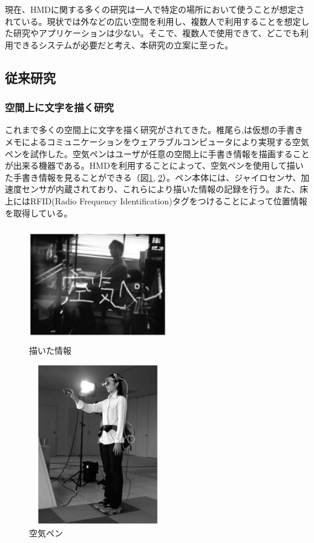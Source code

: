\documentclass[11pt,a4j, titlepage]{jarticle} %
\begin{document}
現在、HMDに関する多くの研究は一人で特定の場所において使うことが想定されている。現状では外などの広い空間を利用し、複数人で利用することを想定した研究やアプリケーションは少ない。そこで、複数人で使用できて、どこでも利用できるシステムが必要だと考え、本研究の立案に至った。

\subsection{従来研究}
\subsubsection{空間上に文字を描く研究}
これまで多くの空間上に文字を描く研究がされてきた。椎尾ら\cite{siio},\cite{siio2}は仮想の手書きメモによるコミュニケーションをウェアラブルコンピュータにより実現する空気ペンを試作した。空気ペンはユーザが任意の空間上に手書き情報を描画することが出来る機器である。HMDを利用することによって、空気ペンを使用して描いた手書き情報を見ることができる（図\ref{fig:tegakijouhou}, \ref{fig:kuukipen}）。ペン本体には、ジャイロセンサ、加速度センサが内蔵されており、これらにより描いた情報の記録を行う。また、床上にはRFID(Radio Frequency Identification)タグをつけることによって位置情報を取得している。

\begin{figure}[H]
  \begin{center}
    \includegraphics[clip,height=5.0cm,width=6.0cm]{./tegakijouhou.eps}
    \caption{描いた情報}
    \label{fig:tegakijouhou}
  \end{center}
\end{figure}

\begin{figure}[H]
  \begin{center}
    \includegraphics[clip,height=7.0cm,width=6.0cm]{./kuukipen.eps}
    \caption{空気ペン}
    \label{fig:kuukipen}
  \end{center}
\end{figure}
\end{document}
